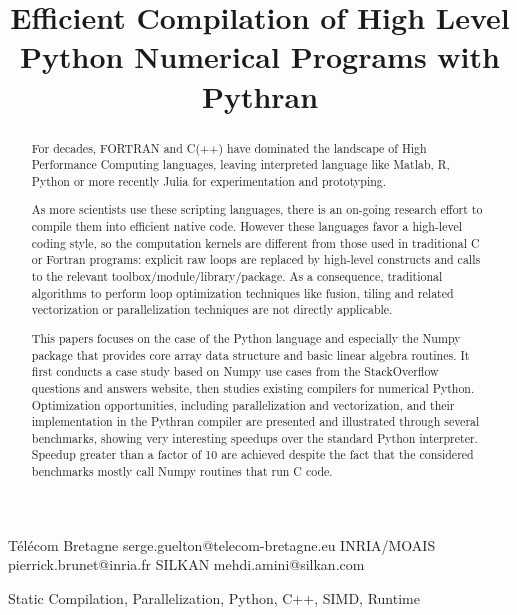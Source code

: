 \documentclass[10pt, preprint]{sigplanconf}
\begin{document}
\title{Efficient Compilation of High Level Python Numerical Programs with Pythran}

           {T{\'e}l{\'e}com Bretagne}
           {serge.guelton@telecom-bretagne.eu}
           {INRIA/MOAIS}
           {pierrick.brunet@inria.fr}
           {SILKAN}
           {mehdi.amini@silkan.com}

\maketitle

\begin{abstract}

    For decades, FORTRAN and C(++) have dominated the landscape of High
    Performance Computing languages, leaving interpreted language like Matlab,
    R, Python or more recently Julia for experimentation and prototyping.

    As more scientists use these scripting languages, there is an on-going
    research effort to compile them into efficient native code. However these
    languages favor a high-level coding style, so the computation kernels are
    different from those used in traditional C or Fortran programs:
    explicit raw loops are replaced by high-level constructs and calls to the
    relevant toolbox/module/library/package. As a consequence, traditional
    algorithms to perform loop optimization techniques like fusion, tiling and
    related vectorization or parallelization techniques are not directly
    applicable.

    This papers focuses on the case of the Python language and especially the
    Numpy package that provides core array data structure and basic linear
    algebra routines. It first conducts a case study based on Numpy use
    cases from the StackOverflow questions and answers website, then studies
    existing compilers for numerical Python. Optimization opportunities,
    including parallelization and vectorization, and their implementation in
    the Pythran compiler are presented and illustrated through several
    benchmarks, showing very interesting speedups over the standard Python
    interpreter. Speedup greater than a factor of 10 are achieved despite the
    fact that the considered benchmarks mostly call Numpy routines that run C code.

\end{abstract}


\keywords
Static Compilation, Parallelization, Python, C++, SIMD, Runtime
\end{document}
